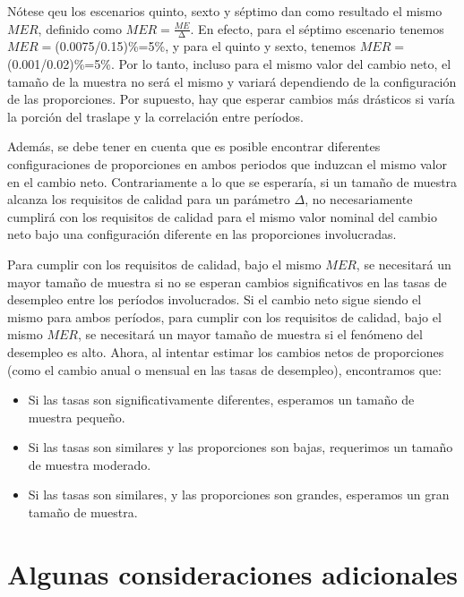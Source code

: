 \documentclass[
  12pt,
  spanish,
]{book}
\providecommand{\tightlist}{%
  \setlength{\itemsep}{0pt}\setlength{\parskip}{0pt}}
\begin{document}
Nótese qeu los escenarios quinto, sexto y séptimo dan como resultado el mismo \(MER\), definido como
\(MER=\frac{ME}{\mathrm{\Delta}}\). En efecto, para el séptimo escenario tenemos \(MER=\)(0.0075/0.15)\%=5\%, y para el quinto y sexto, tenemos \(MER=\)(0.001/0.02)\%=5\%. Por lo tanto, incluso para el mismo valor del cambio neto, el tamaño de la muestra no será el mismo y variará dependiendo de la configuración de las proporciones. Por supuesto, hay que esperar cambios más drásticos si varía la porción del traslape y la correlación entre períodos.

Además, se debe tener en cuenta que es posible encontrar diferentes configuraciones de proporciones en ambos periodos que induzcan el mismo valor en el cambio neto. Contrariamente a lo que se esperaría, si un tamaño de muestra alcanza los requisitos de calidad para un parámetro \(\Delta\), no necesariamente cumplirá con los requisitos de calidad para el mismo valor nominal del cambio neto bajo una configuración diferente en las proporciones involucradas.

Para cumplir con los requisitos de calidad, bajo el mismo \(MER\), se necesitará un mayor tamaño de muestra si no se esperan cambios significativos en las tasas de desempleo entre los períodos involucrados. Si el cambio neto sigue siendo el mismo para ambos períodos, para cumplir con los requisitos de calidad, bajo el mismo \(MER\), se necesitará un mayor tamaño de muestra si el fenómeno del desempleo es alto. Ahora, al intentar estimar los cambios netos de proporciones (como el cambio anual o mensual en las tasas de desempleo), encontramos que:

\begin{itemize}
\tightlist
\item
  Si las tasas son significativamente diferentes, esperamos un tamaño de muestra pequeño.
\item
  Si las tasas son similares y las proporciones son bajas, requerimos un tamaño de muestra moderado.
\item
  Si las tasas son similares, y las proporciones son grandes, esperamos un gran tamaño de muestra.
\end{itemize}

\hypertarget{algunas-consideraciones-adicionales}{%
\section{Algunas consideraciones adicionales}\label{algunas-consideraciones-adicionales}}
\end{document}
